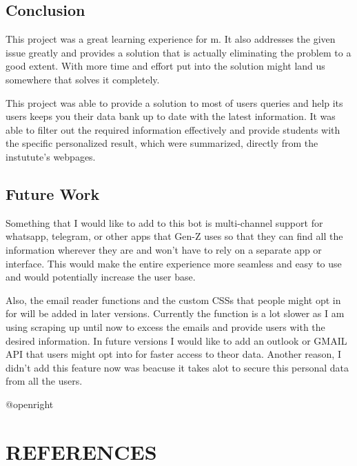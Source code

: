 \documentclass[14pt]{extarticle}
\makeatletter
\newcommand\backmatter{
    \if @openright
        \cleardoublepage
    \else
        \clearpage
    \fi
}
\makeatother
\begin{document}
\subsection{Conclusion}

This project was a great learning experience for m. It also addresses the given issue greatly and provides a solution that is actually eliminating the problem to a good extent. With more time and effort put into the solution might land us somewhere that solves it completely.

This project was able to provide a solution to most of users queries and help its users keeps you their data bank up to date with the latest information. It was able to filter out the required information effectively and provide students with the specific personalized result, which were summarized, directly from the instutute's webpages.

\subsection{Future Work}

Something that I would like to add to this  bot is multi-channel support for whatsapp, telegram, or other apps that Gen-Z uses so that they can find all the information wherever they are and won't have to rely on a separate app or interface. This would make the entire experience more seamless and easy to use and would potentially increase the user base.

Also, the email reader functions and the custom CSSs that people might opt in for will be added in later versions. Currently the function is a lot slower as I am using scraping up until now to excess the emails and provide users with the desired information. In future versions I would like to add an outlook or GMAIL API that users might opt into for faster access to theor data. Another reason, I didn't add this feature now was beacuse it takes alot to secure this personal data from all the users.


\backmatter

\newpage
{}
\section*{REFERENCES}
\end{document}
